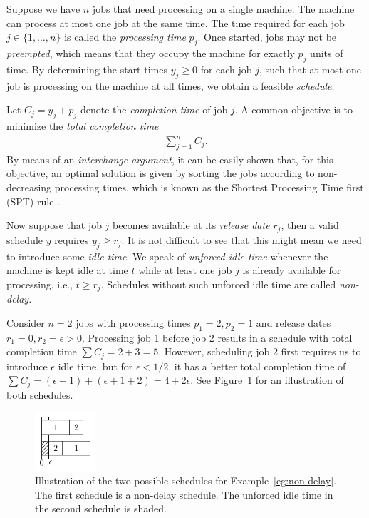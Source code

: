 \documentclass{article}
\theoremstyle{definition}
\theoremstyle{plain}
\begin{document}
Suppose we have $n$ jobs that need processing on a single machine. The machine
can process at most one job at the same time. The time required for each job
$j \in \{1, \dots, n\}$ is called the \textit{processing time} $p_{j}$. Once
started, jobs may not be \textit{preempted}, which means that they occupy the
machine for exactly $p_{j}$ units of time. By determining the start times
$y_{j} \geq 0$ for each job $j$, such that at most one job is processing on the
machine at all times, we obtain a feasible \textit{schedule}.

Let $C_{j} = y_{j} + p_{j}$ denote the \textit{completion time} of job $j$. A
common objective is to minimize the \textit{total completion time}
\begin{align*}
  \sum_{j=1}^{n} C_{j} .
\end{align*}
By means of an \textit{interchange argument}, it can be
easily shown that, for this objective, an optimal solution is given by sorting
the jobs according to non-decreasing processing times, which is known as the
Shortest Processing Time first (SPT) rule \cite{pinedoSchedulingTheoryAlgorithms2016}.

Now suppose that job $j$ becomes available at its \textit{release date} $r_{j}$,
then a valid schedule $y$ requires $y_{j} \geq r_{j}$. It is not difficult to
see that this might mean we need to introduce some \textit{idle time}. We speak
of \textit{unforced idle time} whenever the machine is kept idle at time $t$
while at least one job $j$ is already available for processing, i.e.,
$t \geq r_{j}$. Schedules without such unforced idle time are called
\textit{non-delay}.

\begin{eg}
  \label{eg:non-delay}
  Consider $n=2$ jobs with processing times $p_{1}=2, p_{2}=1$ and release dates
  $r_{1}=0, r_{2}=\epsilon > 0$. Processing job 1 before job 2 results in a
  schedule with total completion time $\sum C_{j} = 2 + 3 = 5$. However,
  scheduling job 2 first requires us to introduce $\epsilon$ idle time, but for
  $\epsilon < 1/2$, it has a better total completion time of
  $\sum C_{j} = (\epsilon + 1) + (\epsilon + 1 + 2) = 4 + 2 \epsilon$. See
  Figure~\ref{fig:non-delay} for an illustration of both schedules.
\end{eg}

\begin{figure}
  \centering
  \includegraphics[width=0.2\textwidth]{figures/non-delay.pdf}
  \caption{Illustration of the two possible schedules for
    Example~\ref{eg:non-delay}. The first schedule is a non-delay schedule. The
    unforced idle time in the second schedule is shaded.}
  \label{fig:non-delay}
\end{figure}
\end{document}
